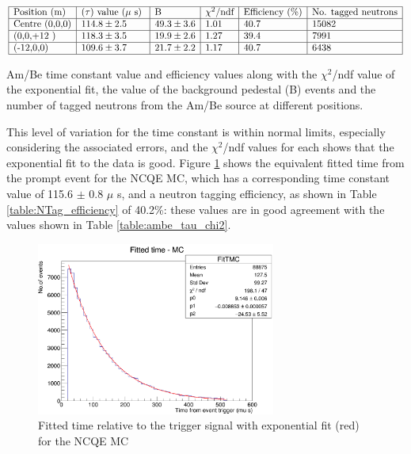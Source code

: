 \begin{table}
    $$
    \begin{array}{|l|l|l|l|l|l|l|}
    \hline \text{Position (m)} & \text {($\tau$) value ($\mu$ s) } & \text{B} & \text{$\chi^{2}$/ndf} & \text{Efficiency (\%)} & \text{No. tagged neutrons} \\
    \hline \text{Centre (0,0,0)} & 114.8 \pm 2.5 & 49.3 \pm 3.6 & 1.01 & 40.7 & 15082 \\
    \hline \text{(0,0,+12 )} & 118.3 \pm 3.5 & 19.9 \pm 2.6 & 1.27 & 39.4 & 7991\\
    \hline \text{(-12,0,0)} & 109.6 \pm 3.7 & 21.7 \pm 2.2 & 1.17 & 40.7 & 6438 \\
    \hline
    \end{array}
    $$
    \caption{Am/Be time constant value and efficiency values along with the $\chi^{2}$/ndf value of the exponential fit, the value of the background pedestal (B) events and the number of tagged neutrons from the Am/Be source at different positions.}
    \label{table:ambe_tau_chi2}
\end{table}

This level of variation for the time constant is within normal limits, especially considering the associated errors, and the $\chi^{2}$/ndf values for each shows that the exponential fit to the data is good. Figure \ref{fig:MC_time_constant} shows the equivalent fitted time from the prompt event for the NCQE MC, which has a corresponding time constant value of 115.6 $\pm$ 0.8 $\mu$ s, and a neutron tagging efficiency, as shown in Table \ref{table:NTag_efficiency} of 40.2\%: these values are in good agreement with the values shown in Table \ref{table:ambe_tau_chi2}. 

\begin{figure}
    \centering
    \includegraphics[width=0.7\textwidth]{Figures/MC_fitT.png}
    \caption{Fitted time relative to the trigger signal with exponential fit (red) for the NCQE MC}
    \label{fig:MC_time_constant}
\end{figure}

